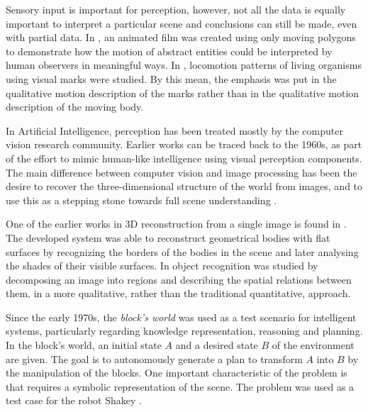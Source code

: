 \documentclass[a4paper, 12pt, openany, oneside]{book}
\begin{document}

Sensory input is important for perception, however, not all the data is equally important to interpret a particular scene and conclusions can still be made, even with partial data.
In \citep{Heider1944_Experimental}, an animated film was created using only moving polygons to demonstrate how the motion of abstract entities could be interpreted by human observers in meaningful ways.
In \citep{Johansson1973_VisualPer}, locomotion patterns of living organisms using visual marks were studied. 
By this mean, the emphasis was put in the qualitative motion description of the marks rather than in the qualitative motion description of the moving body.

In Artificial Intelligence, perception has been treated mostly by the computer vision research community.
Earlier works can be traced back to the 1960s, as part of the effort to mimic human-like intelligence using visual perception components. The main difference between computer vision and image processing has been the desire to recover the three-dimensional structure of the world from images, and to use this as a stepping stone towards full scene understanding \citep{Winston1975_PsyCV}. 


One of the earlier works in 3D reconstruction from a single image is found in \citep{Roberts1963_PhDThesis}.
The developed system was able to reconstruct geometrical bodies with flat surfaces by recognizing the borders of the bodies in the scene and later analysing the shades of their visible surfaces.
In \citep{Barrow1971_RelatDesc} object recognition was studied by decomposing an image into regions and describing the spatial relations between them, in a more qualitative, rather than the traditional quantitative, approach.

Since the early 1970s, the \textit{block's world} was used as a test scenario for intelligent systems, particularly regarding knowledge representation, reasoning and planning.
In the block's world, an initial state $A$ and a desired state $B$  of the environment are given.
The goal is to autonomously generate a plan to transform $A$ into $B$ by the manipulation of the blocks.
One important characteristic of the problem is that requires a symbolic representation of the scene.
The problem was used as a test case for the robot Shakey \citep{Nilsson84_Shakey}.
\end{document}
